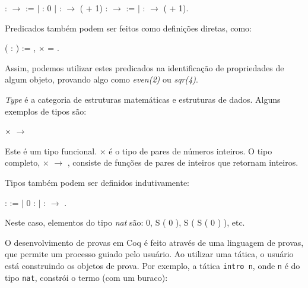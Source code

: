 \bigskip {}  : 
\ensuremath{\rightarrow}  :=\coqdoceol 
\coqdocindent{2.00em}\ensuremath{|}  :  0\coqdoceol
\coqdocindent{2.00em}\ensuremath{|}   :
  \ensuremath{\rightarrow} 
( + 1)\coqdoceol {}  :
 \ensuremath{\rightarrow}  :=\coqdoceol
\coqdocindent{2.00em}\ensuremath{|}   :
  \ensuremath{\rightarrow} 
( + 1).\coqdoceol \bigskip

Predicados também podem ser feitos como definições diretas, como:

\bigskip
{}  ( : ) :=
\coqdoctac{\ensuremath{\exists}} , 
\ensuremath{\times}  = .\coqdoceol
\bigskip

Assim, podemos utilizar estes predicados na identificação de  propriedades de
algum objeto, provando algo como \emph{even(2)} ou \emph{sqr(4)}.

\emph{Type} é a categoria de estruturas matemáticas e estruturas de dados.
Alguns exemplos de tipos são:

\bigskip
{} \ensuremath{\times} 
\ensuremath{\rightarrow} 
\bigskip

Este é um tipo funcional.   \ensuremath{\times}
 é o tipo de pares de números inteiros. O tipo completo,
 \ensuremath{\times} 
\ensuremath{\rightarrow} , consiste de funções de pares
de inteiros que retornam inteiros.

Tipos também podem ser definidos indutivamente:

\bigskip
{}  :  :=\coqdoceol
\coqdocindent{2.00em} \ensuremath{|} 0 : \coqdoceol 
\coqdocindent{2.00em} \ensuremath{|}  :  \ensuremath{\rightarrow}
.\coqdoceol
\bigskip

Neste caso, elementos do tipo \emph{nat} são: 0, S ( 0 ), S ( S ( 0 ) ), etc.

O desenvolvimento de provas em Coq é feito através de uma linguagem de provas,
que permite um processo guiado pelo usuário. Ao utilizar uma tática, o usuário
está construindo os objetos de prova. Por exemplo, a tática
\texttt{intro n}, onde \texttt{n} é do tipo \texttt{nat}, constrói o termo (com um
buraco):

